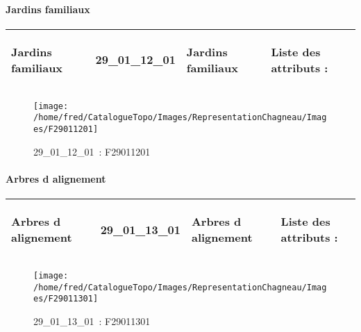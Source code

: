 \documentclass[12pt,titlepage,oneside]{book}
\begin{document}
\paragraph{Jardins familiaux}
\noindent
\vspace{\baselineskip}

\renewcommand{\arraystretch}{1.2}
\begin{supertabular}{|p{10cm}|c|p{13cm}|p{12cm}|}
 Jardins familiaux & 29\_01\_12\_01 & Jardins familiaux & Liste des attributs :
\begin{enumerate}
\end{enumerate}
\\
\hline
\end{supertabular}
\begin{figure}[h!]
  \hfill         %
  \begin{minipage}[t]{3cm}
    \begin{center}
      \texttt{[image: /home/fred/CatalogueTopo/Images/RepresentationChagneau/Images/F29011201]}
      \caption[~29\_01\_12\_01]{\small{29\_01\_12\_01~:} \tiny{F29011201}}\label{F29011201}
    \end{center}
  \end{minipage}
\end{figure}


\paragraph{Arbres d alignement}
\noindent
\vspace{\baselineskip}

\renewcommand{\arraystretch}{1.2}
\begin{supertabular}{|p{10cm}|c|p{13cm}|p{12cm}|}
 Arbres d alignement & 29\_01\_13\_01 & Arbres d alignement & Liste des attributs :
\begin{enumerate}
\end{enumerate}
\\
\hline
\end{supertabular}
\begin{figure}[h!]
  \hfill         %
  \begin{minipage}[t]{3cm}
    \begin{center}
      \texttt{[image: /home/fred/CatalogueTopo/Images/RepresentationChagneau/Images/F29011301]}
      \caption[~29\_01\_13\_01]{\small{29\_01\_13\_01~:} \tiny{F29011301}}\label{F29011301}
    \end{center}
  \end{minipage}
\end{figure}
\end{document}

